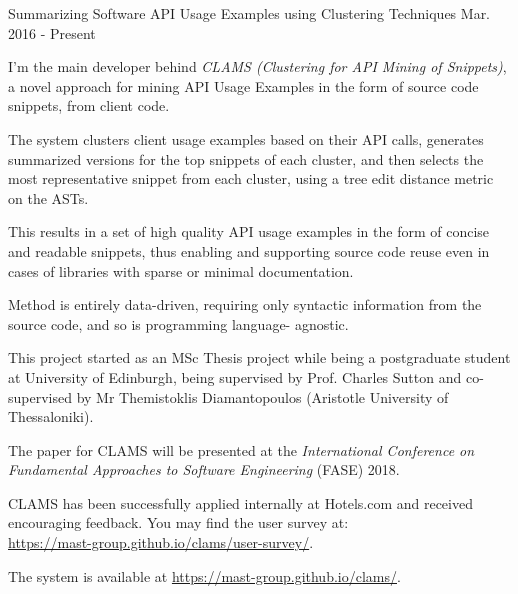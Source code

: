 

\begin{cventries}

  \cventry
    {Summarizing Software API Usage Examples using
Clustering Techniques} %
	{}
	{}
    {Mar. 2016 - Present} %
    {
      \begin{cvitems} %
        \item {I'm the main developer behind \textit{CLAMS (Clustering for API Mining of Snippets)}, a novel approach for mining API Usage Examples in the form of source code snippets, from client code.}
		\item {The system clusters client usage examples based on their API calls, generates summarized versions for the top snippets of each cluster, and then selects the most representative snippet from each cluster, using a tree edit distance metric on the ASTs.}
		\item {This results in a set of high quality API usage examples in the form of concise and readable snippets, thus enabling and supporting source code reuse even in cases of libraries with sparse or minimal documentation.}
		\item {Method is entirely data-driven, requiring only syntactic information from the source code, and so is programming language- agnostic.}
		\item {This project started as an MSc Thesis project while being a postgraduate student at University of Edinburgh, being supervised by Prof. Charles Sutton and co-supervised by Mr Themistoklis Diamantopoulos (Aristotle University of Thessaloniki).}
		\item {The paper for CLAMS will be presented at the \textit{International Conference on Fundamental Approaches to Software Engineering} (FASE) 2018.}
		\item {CLAMS has been successfully applied internally at Hotels.com and received encouraging feedback. You may find the user survey at: \\
		 \url{https://mast-group.github.io/clams/user-survey/}.}
		\item {The system is available at \url{https://mast-group.github.io/clams/}.}
      \end{cvitems}
    }
    

\end{cventries}
